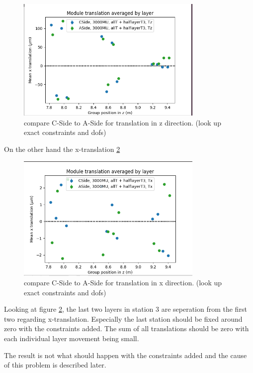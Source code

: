 \begin{figure}
  \centering
  \includegraphics[width=0.8\textwidth]{plots/june_21/CA_allT_halfT3_Tz.png}
  \caption{compare C-Side to A-Side for translation in z direction. (look up exact constraints and dofs)}
  \label{fig:june_5}
\end{figure}

On the other hand the x-translation \ref{fig:june_6}

\begin{figure}
  \centering
  \includegraphics[width=0.8\textwidth]{plots/june_21/CA_allT_halfT3_Tx.png}
  \caption{compare C-Side to A-Side for translation in x direction. (look up exact constraints and dofs)}
  \label{fig:june_6}
\end{figure}

Looking at figure \ref{fig:june_6}, the last two layers in station 3 are
seperation from the first two regarding x-translation. Especially the last
station should be fixed around zero with the constraints added. The sum of
all translations should be zero with each individual layer movement being small.

The result is not what should happen with the constraints added and the cause of this problem is described later.

